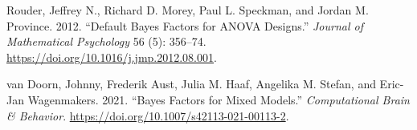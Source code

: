 \documentclass[
  a4paper,
  DIV=11,
  numbers=noendperiod,
  oneside]{scrartcl}
\newlength{\cslhangindent}
\newlength{\cslentryspacingunit} %
\newenvironment{CSLReferences}[2] %
 {%
  \setlength{\parindent}{0pt}
  \ifodd #1
  \let\oldpar\par
  \def\par{\hangindent=\cslhangindent\oldpar}
  \fi
  \setlength{\parskip}{#2\cslentryspacingunit}
 }%
 {}
\begin{document}
\hypertarget{refs}{}
\begin{CSLReferences}{1}{0}
\leavevmode{}%
Rouder, Jeffrey N., Richard D. Morey, Paul L. Speckman, and Jordan M.
Province. 2012. {``Default Bayes Factors for ANOVA Designs.''}
\emph{Journal of Mathematical Psychology} 56 (5): 356--74.
\url{https://doi.org/10.1016/j.jmp.2012.08.001}.

\leavevmode{}%
van Doorn, Johnny, Frederik Aust, Julia M. Haaf, Angelika M. Stefan, and
Eric-Jan Wagenmakers. 2021. {``Bayes Factors for Mixed Models.''}
\emph{Computational Brain \& Behavior}.
\url{https://doi.org/10.1007/s42113-021-00113-2}.

\end{CSLReferences}
\end{document}
